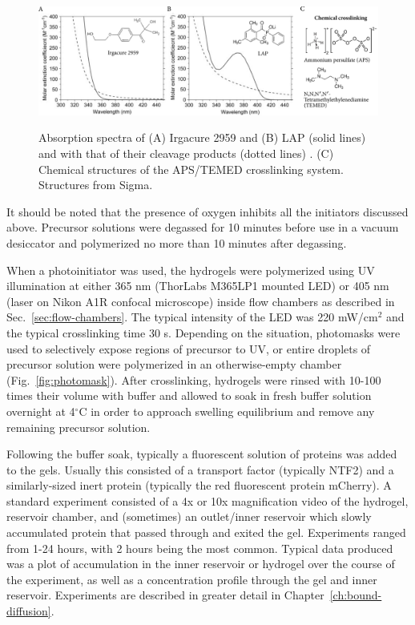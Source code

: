 \begin{figure}
\caption[Photoinitiator properties.]{Absorption spectra of (A) Irgacure 2959 and (B) LAP (solid lines) and with that of their cleavage products (dotted lines) \cite{fairbanks09}. (C) Chemical structures of the APS/TEMED crosslinking system. Structures from Sigma.}
\centering
\includegraphics[width=\textwidth]{figs/ch03/initiators}
\label{fig:initiators}
\end{figure}

It should be noted that the presence of oxygen inhibits all the initiators discussed above.  Precursor solutions were degassed for 10 minutes before use in a vacuum desiccator and polymerized no more than 10 minutes after degassing.

When a photoinitiator was used, the hydrogels were polymerized using UV illumination at either 365 nm (ThorLabs M365LP1 mounted LED) or 405 nm (laser on Nikon A1R confocal microscope) inside flow chambers as described in Sec.~\ref{sec:flow-chambers}.  The typical intensity of the LED was 220 mW/cm$^2$ and the typical crosslinking time 30 s.  Depending on the situation, photomasks were used to selectively expose regions of precursor to UV, or entire droplets of precursor solution were polymerized in an otherwise-empty chamber (Fig.~\ref{fig:photomask}).  After crosslinking, hydrogels were rinsed with 10-100 times their volume with buffer and allowed to soak in fresh buffer solution overnight at 4$^\circ$C in order to approach swelling equilibrium and remove any remaining precursor solution.

Following the buffer soak, typically a fluorescent solution of proteins was added to the gels.  Usually this consisted of a transport factor (typically NTF2) and a similarly-sized inert protein (typically the red fluorescent protein mCherry).  A standard experiment consisted of a 4x or 10x magnification video of the hydrogel, reservoir chamber, and (sometimes) an outlet/inner reservoir which slowly accumulated protein that passed through and exited the gel.  Experiments ranged from 1-24 hours, with 2 hours being the most common.  Typical data produced was a plot of accumulation in the inner reservoir or hydrogel over the course of the experiment, as well as a concentration profile through the gel and inner reservoir.  Experiments are described in greater detail in Chapter~\ref{ch:bound-diffusion}.

